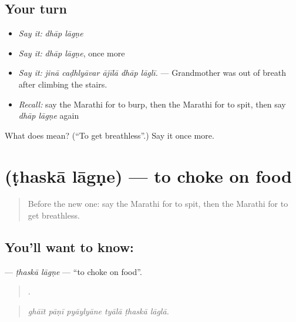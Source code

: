 \subsection*{Your turn}
\begin{itemize}
\raggedright
  \item \emph{Say it:} \emph{dhāp lāgṇe}
  \item \emph{Say it:} \emph{dhāp lāgṇe}, once more
  \item \emph{Say it:} \emph{jinā caḍhlyāvar ājīlā dhāp lāglī.} — Grandmother was out of breath after climbing the stairs.
  \item \emph{Recall:} say the Marathi for to burp, then the Marathi for to spit, then say \emph{dhāp lāgṇe} again
\end{itemize}

\begin{tcolorbox}[breakable,colback=teal!4,colframe=teal!35!black,title={Before you move on}]
What does   mean? (\textquotedblleft{}To get breathless\textquotedblright{}.) Say it once more.
\end{tcolorbox}
\section[\texorpdfstring{\mr{ठसका} \mr{लागणे} (ṭhaskā lāgṇe)}{ठसका लागणे (ṭhaskā lāgṇe)}]{  (ṭhaskā lāgṇe) — to choke on food}

\label{lesson:MR-C492-thaska-lagne}



\begin{quote}
Before the new one: say the Marathi for to spit, then the Marathi for to get breathless.
\end{quote}

\subsection*{You'll want to know:  }
\textbf{ } — \emph{ṭhaskā lāgṇe} — \textquotedblleft{}to choke on food\textquotedblright{}.

\begin{quote}
     .
\end{quote}

\begin{quote}
\emph{ghāīt pāṇī pyāylyāne tyālā ṭhaskā lāglā.}
\end{quote}

